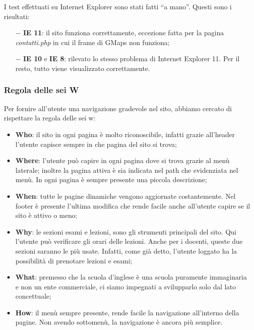 \documentclass[12pt, a4paper]{article}
\begin{document}
I test effettuati su Internet Explorer sono stati fatti “a mano”. Questi sono i risultati:
\begin{itemize}
	\item[$-$] \textbf{IE 11}: il sito funziona correttamente, eccezione fatta per la 
	pagina \emph{contatti.php} in cui il frame di GMaps non funziona;
	\item[$-$] \textbf{IE 10} e \textbf{IE 8}: rilevato lo stesso problema di Internet Explorer 11. Per il resto, tutto viene visualizzato  correttamente. 
\end{itemize}

\subsubsection{Regola delle sei W}
Per fornire all’utente una navigazione gradevole nel sito, abbiamo cercato di rispettare 
la regola delle sei w:
\begin{itemize}
	\item \textbf{Who}: il sito in ogni pagina è molto riconoscibile, infatti grazie
	all’header l’utente capisce sempre in che pagina del sito si trova;
	\item \textbf{Where}: %
	l’utente può capire in ogni pagina dove si trova grazie al menù laterale; inoltre la pagina attiva è sia indicata nel path che evidenziata nel menù. 
	In ogni pagina è sempre presente una piccola descrizione;
	\item \textbf{When}: tutte le pagine dinamiche vengono aggiornate costantemente. 
	Nel footer è presente l’ultima modifica che rende facile anche all’utente capire se il
	 sito è attivo o meno;
	\item \textbf{Why}: le sezioni esami e lezioni, sono gli strumenti principali del sito.
	Qui l’utente può verificare gli orari delle lezioni. 
	Anche per i docenti, queste due
	sezioni saranno le più usate. Infatti, come già detto, l'utente loggato ha la possibilità
	di prenotare lezioni e esami;
	\item \textbf{What}: premesso che la scuola d’inglese è una scuola puramente immaginaria 
	e non un ente commerciale, ci siamo impegnati a svilupparlo solo dal lato concettuale;
	\item \textbf{How}: il menù sempre presente, rende facile la navigazione all’interno
	della pagine. Non avendo sottomenù, la navigazione è ancora più semplice.
\end{itemize}
\end{document}
